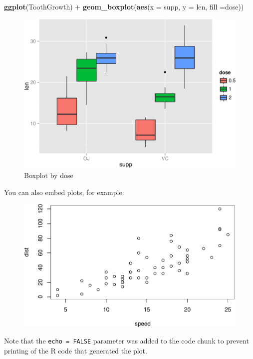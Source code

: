 \documentclass[]{article}
\newenvironment{Shaded}{\begin{snugshade}}{\end{snugshade}}
\newcommand{\KeywordTok}[1]{\textcolor[rgb]{0.13,0.29,0.53}{\textbf{{#1}}}}
\newcommand{\DataTypeTok}[1]{\textcolor[rgb]{0.13,0.29,0.53}{{#1}}}
\newcommand{\StringTok}[1]{\textcolor[rgb]{0.31,0.60,0.02}{{#1}}}
\newcommand{\NormalTok}[1]{{#1}}
\begin{document}
\begin{Shaded}
\begin{Highlighting}[]
\KeywordTok{ggplot}\NormalTok{(ToothGrowth) +}\StringTok{ }\KeywordTok{geom_boxplot}\NormalTok{(}\KeywordTok{aes}\NormalTok{(}\DataTypeTok{x =} \NormalTok{supp, }\DataTypeTok{y =} \NormalTok{len, }\DataTypeTok{fill =}\NormalTok{dose)) }
\end{Highlighting}
\end{Shaded}

\begin{figure}

{\centering \includegraphics[width=.7\textwidth]{Tooth_Growth_Inferential_Data_Analysis_files/figure-latex/bp_by_supp_and_dose-1} 

}

\caption{Boxplot by dose}\label{fig:bp_by_supp_and_dose}
\end{figure}

You can also embed plots, for example:

\begin{figure}[htbp]
\centering
\includegraphics{Tooth_Growth_Inferential_Data_Analysis_files/figure-latex/unnamed-chunk-2-1.pdf}
\caption{}
\end{figure}

Note that the \texttt{echo = FALSE} parameter was added to the code
chunk to prevent printing of the R code that generated the plot.
\end{document}
